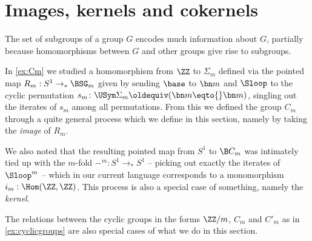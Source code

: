 \section{Images, kernels and cokernels}
\label{subsec:ker}

The set of subgroups of a group $G$ encodes much information about $G$, partially because homomorphisms between $G$ and other groups give rise to subgroups.

In \cref{ex:Cm} we studied a homomorphism from $\ZZ$ to $\Sigma_m$ defined via the pointed map $R_m:S^1\to_*\BSG_m$ given by sending $\base$ to $\bn m$ and
$\Sloop$ to the cyclic permutation $s_m\colon\USym\Sigma_m\oldequiv(\bn m\eqto{}\bn m)$, singling out the iterates of $s_m$ among all permutations.  From this we defined the group $C_m$ through a quite general process which we define in this section, namely by taking the \emph{image} of $R_m$.

We also noted that the resulting pointed map from $S^1$ to $\B C_m$ was intimately tied up with the $m$-fold \covering $-^m:S^1\to_*S^1$ -- picking out exactly the iterates of $\Sloop^m$ -- which in our current language corresponds to a monomorphism $i_m:\Hom(\ZZ,\ZZ)$. This process is also a special case of something, namely the \emph{kernel}.

The relations between the cyclic groups in the forms $\ZZ/m$, $C_m$ and $C'_m$ as in \cref{ex:cyclicgroups} are also special cases of  what we do in this section.



